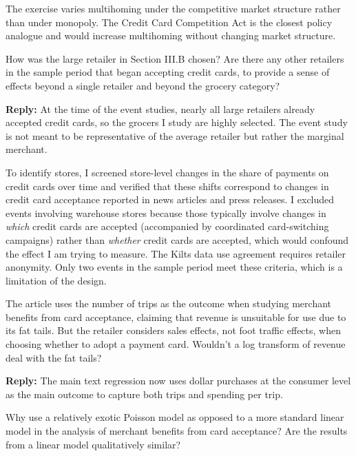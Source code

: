 \documentclass[main.tex]{subfiles}
\begin{document}
\begin{refsection}
The exercise varies multihoming under the competitive market structure rather than under monopoly. The Credit Card Competition Act is the closest policy analogue and would increase multihoming without changing market structure.

\begin{refcommentnoclear}
How was the large retailer in Section III.B chosen?
Are there any other retailers in the sample period that began accepting credit cards, to provide a sense of effects beyond a single retailer and beyond the grocery category?
\end{refcommentnoclear}

\textbf{Reply:} At the time of the event studies, nearly all large retailers already accepted credit cards, so the grocers I study are highly selected.
The event study is not meant to be representative of the average retailer but rather the marginal merchant.

To identify stores, I screened store-level changes in the share of payments on credit cards over time and verified that these shifts correspond to changes in credit card acceptance reported in news articles and press releases.
I excluded events involving warehouse stores because those typically involve changes in \emph{which} credit cards are accepted (accompanied by coordinated card-switching campaigns) rather than \emph{whether} credit cards are accepted, which would confound the effect I am trying to measure.
The Kilts data use agreement requires retailer anonymity.
Only two events in the sample period meet these criteria, which is a limitation of the design.

\begin{refcommentnoclear}
The article uses the number of trips as the outcome when studying merchant benefits from card acceptance, claiming that revenue is unsuitable for use due to its fat tails.
But the retailer considers sales effects, not foot traffic effects, when choosing whether to adopt a payment card.
Wouldn't a log transform of revenue deal with the fat tails?

\end{refcommentnoclear}

\textbf{Reply:} The main text regression now uses dollar purchases at the consumer level as the main outcome to capture both trips and spending per trip.

\begin{refcommentnoclear}
Why use a relatively exotic Poisson model as opposed to a more standard linear model in the analysis of merchant benefits from card acceptance?
Are the results from a linear model qualitatively similar?


\end{refcommentnoclear}
\end{refsection}
\end{document}
